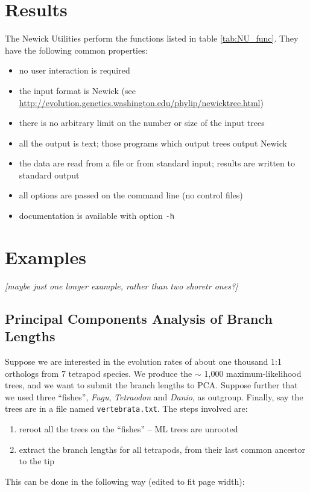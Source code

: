 \documentclass{article}
\newcommand{\nutils}{Newick Utilities}
\begin{document}
\section{Results}

The \nutils{} perform the functions listed in table \ref{tab:NU_func}. They have the following common properties:

\begin{itemize}
 \item no user interaction is required
 \item the input format is Newick (see \url{http://evolution.genetics.washington.edu/phylip/newicktree.html})
 \item there is no arbitrary limit on the number or size of the input trees
 \item all the output is text; those programs which output trees output Newick
 \item the data are read from a file or from standard input; results are written to standard output
 \item all options are passed on the command line (no control files)
 \item documentation is available with option \texttt{-h}
\end{itemize}

\section*{Examples}

\emph{[maybe just one longer example, rather than two shoretr ones?]}

\subsection*{Principal Components Analysis of Branch Lengths}

Suppose we are interested in the evolution rates of about one thousand 1:1 orthologs from 7 tetrapod species. We produce the $\sim$ 1,000 maximum-likelihood trees, and we want to submit the branch lengths to \textsc{PCA}. Suppose further that we used three ``fishes'', \textit{Fugu}, \textit{Tetraodon} and \textit{Danio}, as outgroup. Finally, say the trees are in a file named \texttt{vertebrata.txt}. The steps involved are:
\begin{enumerate}
 \item reroot all the trees on the ``fishes'' -- ML trees are unrooted
 \item extract the branch lengths for all tetrapods, from their last common ancestor to the tip
\end{enumerate}
This can be done in the following way (edited to fit page width):
\end{document}
